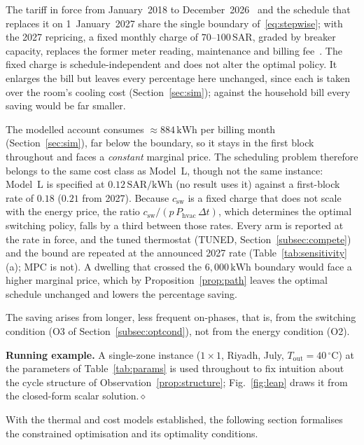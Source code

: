 \documentclass[3p,twocolumn,number]{elsarticle}
\newcommand{\Tout}{T_{\mathrm{out}}}
\newcommand{\csw}{c_{\mathrm{sw}}}
\newcommand{\Phvac}{P_{\mathrm{hvac}}}
\newcommand{\SAR}{\text{SAR}}
\newcommand{\kWh}{\text{kWh}}
\begin{document}
\begin{remark}
\label{rem:current_tariff}
The tariff in force from January~2018 to December~2026~\cite{SEC2024} and the schedule that replaces it on 1~January~2027 share the single boundary of~\eqref{eq:stepwise}; with the 2027 repricing, a fixed monthly charge of $70$--$100\,\SAR$, graded by breaker capacity, replaces the former meter reading, maintenance and billing fee~\cite{SaudiEnergy2027}. The fixed charge is schedule-independent and does not alter the optimal policy. It enlarges the bill but leaves every percentage here unchanged, since each is taken over the room's cooling cost (Section~\ref{sec:sim}); against the household bill every saving would be far smaller.

The modelled account consumes ${\approx}884\,\kWh$ per billing month (Section~\ref{sec:sim}), far below the boundary, so it stays in the first block throughout and faces a \emph{constant} marginal price. The scheduling problem therefore belongs to the same cost class as Model~L, though not the same instance: Model~L is specified at $0.12\,\SAR/\kWh$ (no result uses it) against a first-block rate of $0.18$ ($0.21$ from 2027). Because $\csw$ is a fixed charge that does not scale with the energy price, the ratio $\csw/(p\,\Phvac\,\Delta t)$, which determines the optimal switching policy, falls by a third between those rates. Every arm is reported at the rate in force, and the tuned thermostat (TUNED, Section~\ref{subsec:compete}) and the bound are repeated at the announced 2027 rate (Table~\ref{tab:sensitivity}(a); MPC is not). A dwelling that crossed the $6{,}000\,\kWh$ boundary would face a higher marginal price, which by Proposition~\ref{prop:path} leaves the optimal schedule unchanged and lowers the percentage saving.

The saving arises from longer, less frequent on-phases, that is, from the switching condition (O3 of Section~\ref{subsec:optcond}), not from the energy condition (O2).
\end{remark}
 

 
\noindent\textbf{Running example.} A single-zone instance ($1\times1$, Riyadh,
July, $\Tout=40\,^\circ$C) at the parameters of Table~\ref{tab:params} is used throughout to fix intuition about the cycle structure of Observation~\ref{prop:structure}; Fig.~\ref{fig:leap} draws it from the closed-form scalar solution.\hfill$\diamond$
 
With the thermal and cost models established, the following section formalises the constrained optimisation and its optimality conditions.
 
\end{document}
